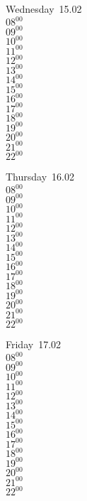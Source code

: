 \documentclass[11pt,a4paper]{book}\usepackage[]{graphicx}\usepackage[]{color}
\begin{document}
\begin{weekdaybox}
  Wednesday~15.02\\
  { 
  \vfill
  $08^{00}$\\
$09^{00}$\\
$10^{00}$\\
$11^{00}$\\
$12^{00}$\\
$13^{00}$\\
$14^{00}$\\
$15^{00}$\\
$16^{00}$\\
$17^{00}$\\
$18^{00}$\\
$19^{00}$\\
$20^{00}$\\
$21^{00}$\\
$22^{00}$\\
  }
\end{weekdaybox}
\clearpage
\begin{headerbox}
\end{headerbox}
\begin{weekdaybox}
  Thursday~16.02\\
  { 
  \vfill
  $08^{00}$\\
$09^{00}$\\
$10^{00}$\\
$11^{00}$\\
$12^{00}$\\
$13^{00}$\\
$14^{00}$\\
$15^{00}$\\
$16^{00}$\\
$17^{00}$\\
$18^{00}$\\
$19^{00}$\\
$20^{00}$\\
$21^{00}$\\
$22^{00}$\\
  }
\end{weekdaybox} 
\begin{weekdaybox}
  Friday~17.02\\
  { 
  \vfill
  $08^{00}$\\
$09^{00}$\\
$10^{00}$\\
$11^{00}$\\
$12^{00}$\\
$13^{00}$\\
$14^{00}$\\
$15^{00}$\\
$16^{00}$\\
$17^{00}$\\
$18^{00}$\\
$19^{00}$\\
$20^{00}$\\
$21^{00}$\\
$22^{00}$\\
  }
\end{weekdaybox}
\end{document}
